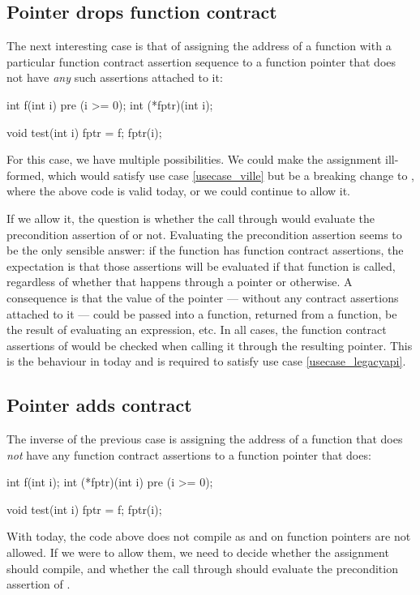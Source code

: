 
\subsection{Pointer drops function contract}
\label{dropping}

The next interesting case is that of assigning the address of a function with a particular function contract assertion sequence to a function pointer that does not have \emph{any} such assertions attached to it:
\begin{codeblock}
int f(int i) pre (i >= 0);
int (*fptr)(int i);

void test(int i) {
  fptr = f; 
  fptr(i); 
}
\end{codeblock}
For this case, we have multiple possibilities. We could make the assignment ill-formed, which would satisfy use case \ref{usecase_ville} but be a breaking change to \cite{P2900R8}, where the above code is valid today, or we could continue to allow it.

If we allow it, the question is whether the call through  would evaluate the precondition assertion of  or not. Evaluating the precondition assertion seems to be the only sensible answer: if the function  has function contract assertions, the expectation is that those assertions will be evaluated if that function is called, regardless of whether that happens through a pointer or otherwise. A consequence is that the value of the pointer  --- without any contract assertions attached to it --- could be passed into a function, returned from a function, be the result of evaluating an expression, etc. In all cases, the function contract assertions of  would be checked when calling it through the resulting pointer. This is the behaviour in \cite{P2900R8} today and is required to satisfy use case \ref{usecase_legacyapi}.


\subsection{Pointer adds contract}
\label{adding}

The inverse of the previous case is assigning the address of a function that does \emph{not} have any function contract assertions to a function pointer that does:
\begin{codeblock}
int f(int i);
int (*fptr)(int i)  pre (i >= 0);

void test(int i) {
  fptr = f;
  fptr(i); 
}
\end{codeblock}
With \cite{P2900R8} today, the code above does not compile as  and  on function pointers are not allowed. If we were to allow them, we need to decide whether the assignment should compile, and whether the call through  should evaluate the precondition assertion of .

